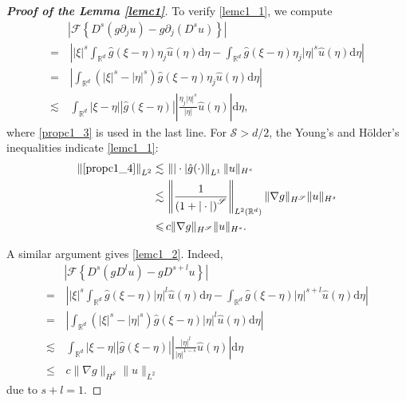 \documentclass[10pt,twoside,a4paper]{article}
\numberwithin{equation}{section}\allowdisplaybreaks
\begin{document}
\begin{appendices}
\begin{proof}[\textbf{Proof of the Lemma \ref{lemc1}}]
			
	To verify  \eqref{lemc1_1},   we compute
			\begin{align} \label{propc1_4}
				&\left|\mathcal{F}\left\{ D^s\left(g \partial_j u \right)-g \partial_j \left(D^s u\right) \right\}\right|\\
				=&\,\left|	\left|\xi\right|^s \int_{\mathbb{R}^d}	\hat{g} (\xi-\eta) \eta_j  \hat{u}(\eta)\mathrm{d} \eta-\int_{\mathbb{R}^d} 	\hat{g} (\xi-\eta) \eta_j |\eta|^s \hat{u}(\eta)\mathrm{d} \eta\right| \nonumber\\
				=&\, \left|\int_{\mathbb{R}^d} \left( \left|\xi\right|^s-\left|\eta\right|^s\right)	\hat{g} (\xi-\eta) \eta_j  \hat{u}(\eta)\mathrm{d} \eta \right|\nonumber \\
				\lesssim &\,\int_{\mathbb{R}^d} \left|\xi-\eta\right|	\left|\hat{g} (\xi-\eta)\right| \left|\frac{\eta_j|\eta|^s}{|\eta|}  \hat{u}(\eta)\right|\mathrm{d} \eta, \nonumber 
			\end{align}
			where   \eqref{propc1_3} is  used in the last line.
		For $ \mathscr{S}>d/2 $,  the  Young's and H\"older's inequalities  indicate \eqref{lemc1_1}:
			\begin{align*}
				\left\| \eqref{propc1_4}\right\|_{L^2}\lesssim &\,\left\||\cdot|\hat{g}(\cdot)\right\|_{L^1}  \|u\|_{H^s}\\
				\lesssim &\,\left\|\frac{1}{\left(1+|\cdot|\right)^{\mathscr{S}}}\right\|_{L^2(\mathbb{R}^d)}  \|\nabla g\|_{H^{\mathscr{S}}}\|u\|_{H^s}\nonumber\\
				\leqslant&\, c \|\nabla g\|_{H^{\mathscr{S}}}\|u\|_{H^s}.\nonumber
			\end{align*}
	 
	 
	 
			
		A similar argument gives \eqref{lemc1_2}. Indeed,	
			\begin{align*}
				&\left|\mathcal{F}\left\{ D^{s}\left(g D^{l} u \right)-g D^{s+l} u\right\}\right|\\
				=&\,\left|	\left|\xi\right|^{s} \int_{\mathbb{R}^d}	\hat{g} (\xi-\eta) |\eta|^{l} \hat{u}(\eta)\mathrm{d} \eta-\int_{\mathbb{R}^d} 	\hat{g} (\xi-\eta)  |\eta|^{s+l} \hat{u}(\eta)\mathrm{d} \eta\right| \nonumber\\
				=&\, \left|\int_{\mathbb{R}^d} \left( \left|\xi\right|^{s}-\left|\eta\right|^{s}\right)	\hat{g} (\xi-\eta) |\eta|^{l} \hat{u}(\eta)\mathrm{d} \eta \right|\nonumber \\
				\lesssim &\,\int_{\mathbb{R}^d} \left|\xi-\eta\right|	\left|\hat{g} (\xi-\eta)\right| \left|\frac{ \left|\eta\right|^{l}}{|\eta|^{1-s}}  \hat{u}(\eta)\right|\mathrm{d} \eta \nonumber \\
				\leqslant&\, c \|\nabla g\|_{H^{\mathscr{S}}}\|u\|_{L^2}\nonumber
			\end{align*}
due to $ s+l= 1. $
		\end{proof}
	

\end{appendices}
\end{document}
